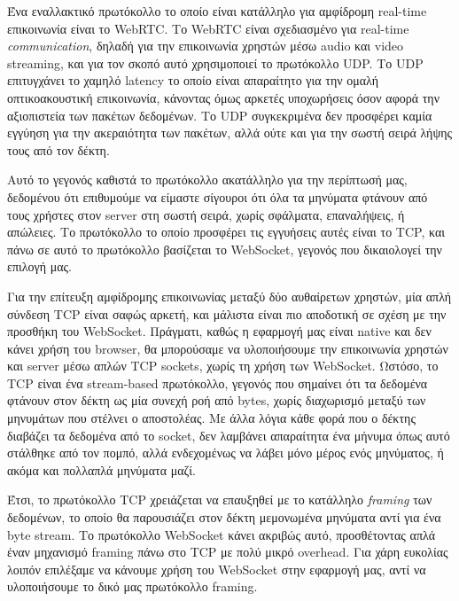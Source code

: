 \documentclass[../thesis.tex]{subfiles}
\begin{document}
Ένα εναλλακτικό πρωτόκολλο το οποίο είναι κατάλληλο για αμφίδρομη real-time επικοινωνία είναι το WebRTC.
Το WebRTC είναι σχεδιασμένο για real-time \textit{communication}, δηλαδή για την επικοινωνία χρηστών μέσω audio και video streaming, και για τον σκοπό αυτό χρησιμοποιεί το πρωτόκολλο UDP.
Το UDP επιτυγχάνει το χαμηλό latency το οποίο είναι απαραίτητο για την ομαλή οπτικοακουστική επικοινωνία, κάνοντας όμως αρκετές υποχωρήσεις όσον αφορά την αξιοπιστεία των πακέτων δεδομένων.
Το UDP συγκεκριμένα δεν προσφέρει καμία εγγύηση για την ακεραιότητα των πακέτων, αλλά ούτε και για την σωστή σειρά λήψης τους από τον δέκτη.

Αυτό το γεγονός καθιστά το πρωτόκολλο ακατάλληλο για την περίπτωσή μας,
δεδομένου ότι επιθυμούμε να είμαστε σίγουροι ότι όλα τα μηνύματα φτάνουν από τους χρήστες στον server στη σωστή σειρά, χωρίς σφάλματα, επαναλήψεις, ή απώλειες.
Το πρωτόκολλο το οποίο προσφέρει τις εγγυήσεις αυτές είναι το TCP, και πάνω σε αυτό το πρωτόκολλο βασίζεται το WebSocket, γεγονός που δικαιολογεί την επιλογή μας.

\bigskip

Για την επίτευξη αμφίδρομης επικοινωνίας μεταξύ δύο αυθαίρετων χρηστών, μία απλή σύνδεση TCP είναι σαφώς αρκετή, και μάλιστα είναι πιο αποδοτική σε σχέση με την προσθήκη του WebSocket.
Πράγματι, καθώς η εφαρμογή μας είναι native και δεν κάνει χρήση του browser, θα μπορούσαμε να υλοποιήσουμε την επικοινωνία χρηστών και server μέσω απλών TCP sockets, χωρίς τη χρήση των WebSocket.
Ωστόσο, το TCP είναι ένα stream-based πρωτόκολλο, γεγονός που σημαίνει ότι τα δεδομένα φτάνουν στον δέκτη ως μία συνεχή ροή από bytes, χωρίς διαχωρισμό μεταξύ των μηνυμάτων που στέλνει ο αποστολέας.
Με άλλα λόγια κάθε φορά που ο δέκτης διαβάζει τα δεδομένα από το socket, δεν λαμβάνει απαραίτητα ένα μήνυμα όπως αυτό στάλθηκε από τον πομπό, αλλά ενδεχομένως να λάβει μόνο μέρος ενός μηνύματος, ή ακόμα και πολλαπλά μηνύματα μαζί.

Έτσι, το πρωτόκολλο TCP χρειάζεται να επαυξηθεί με το κατάλληλο \textit{framing} των δεδομένων, το οποίο θα παρουσιάζει στον δέκτη μεμονωμένα μηνύματα αντί για ένα byte stream.
Το πρωτόκολλο WebSocket κάνει ακριβώς αυτό, προσθέτοντας απλά έναν μηχανισμό framing πάνω στο TCP με πολύ μικρό overhead\cite{rfc6455}.
Για χάρη ευκολίας λοιπόν επιλέξαμε να κάνουμε χρήση του WebSocket στην εφαρμογή μας, αντί να υλοποιήσουμε το δικό μας πρωτόκολλο framing.
\end{document}
